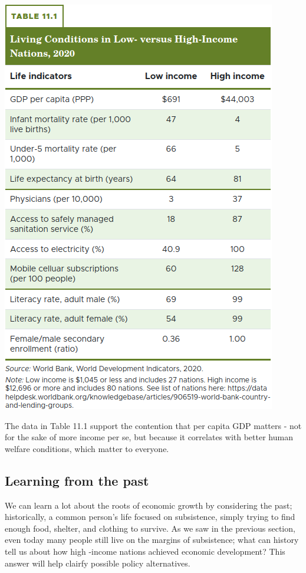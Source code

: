 \documentclass[11pt]{article} %
\begin{document}
\begin{center}
\includegraphics[scale=0.35]{../../images/Chapter 11/table 11.1.png}
\end{center}

The data in Table 11.1 support the contention that per capita GDP matters - not for the sake of more income per se, but because it correlates with better human welfare conditions, which matter to everyone.

\subsection*{Learning from the past}

We can learn a lot about the roots of economic growth by considering the past; historically, a common person's life focused on subsistence, simply trying to find enough food, shelter, and clothing to survive. As we saw in the previous section, even today many people still live on the margins of subsistence; what can history tell us about how high -income nations achieved economic development? This answer will help clairfy possible policy alternatives.
\end{document}

